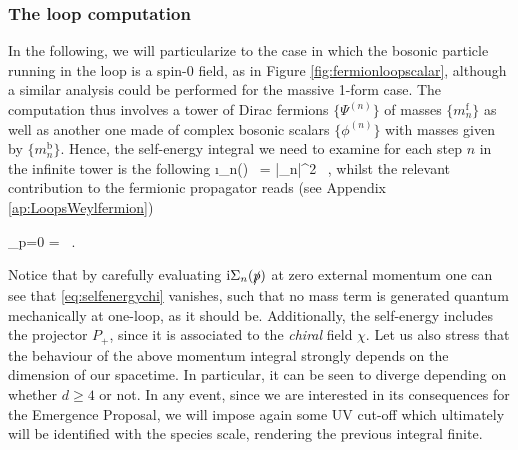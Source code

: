 \subsubsection*{The loop computation}
In the following, we will particularize to the case in which the bosonic particle running in the loop is a spin-0 field, as in Figure \ref{fig:fermionloopscalar}, although a similar analysis could be performed for the massive 1-form case. The computation thus involves a tower of Dirac fermions $\{\Psi^{(n)}\}$ of masses $\{m_n^{{\text{f}}}\}$ as well as another one made of complex bosonic scalars $\{\phi^{(n)}\}$ with masses given by $\{m_n^{{\text{b}}}\}$. Hence, the self-energy integral we need to examine for each step $n$ in the infinite tower is the following
%
\beq
	\i \Sigma_n() \ = |_n|^2 \int {}  \ ,
	\label{eq:selfenergychi}
\eeq
%
whilst the relevant contribution to the fermionic propagator reads (see Appendix \ref{ap:LoopsWeylfermion})
%
\beq
	\begin{aligned}\label{eq:Euclwavefunctionfermion}
		 \bigg\rvert_{p=0} =  \int {} \ .
	\end{aligned}
\eeq
%
Notice that by carefully evaluating $\text{i}\Sigma_n(\slashed{p})$ at zero external momentum one can see that \eqref{eq:selfenergychi} vanishes, such that no mass term is generated quantum mechanically at one-loop, as it should be. Additionally, the self-energy includes the projector $P_{+}$, since it is associated to the \emph{chiral} field $\chi$. Let us also stress that the behaviour of the above momentum integral strongly depends on the dimension  of our spacetime. In particular, it can be seen to diverge depending on whether $d\geq4$ or not. In any event, since we are interested in its consequences for the Emergence Proposal, we will impose again some UV cut-off which ultimately will be identified with the species scale, rendering the previous integral finite.
	
